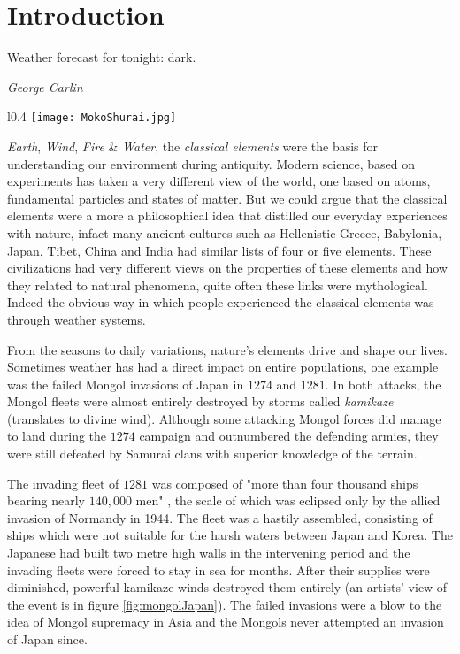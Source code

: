 \chapter{Introduction}\label{chapter:introduction}

\epigraph{Weather forecast for tonight: dark.}{\textit{George Carlin}}

\begin{wrapfigure}{l}{0.4\textwidth}
    \centering\texttt{[image: MokoShurai.jpg]}
    \caption{\small The Mongol fleet destroyed in a typhoon, ink and water on paper, by Kikuchi Y\={o}sai, 1847. 
    Source: Wikipedia}
    \label{fig:mongolJapan}
\end{wrapfigure}

\emph{Earth}, \emph{Wind}, \emph{Fire} \& \emph{Water}, the \emph{classical elements} were the basis 
for understanding our environment during antiquity. Modern science, based on experiments has taken a very 
different view of the world, one based on atoms, fundamental particles and states of matter. But we could 
argue that the classical elements were a more a philosophical idea that distilled our everyday experiences 
with nature, infact many ancient cultures such as Hellenistic Greece, Babylonia, Japan, Tibet, China and 
India had similar lists of four or five elements. These civilizations had very different views on the 
properties of these elements and how they related to natural phenomena, quite often these links 
were mythological. Indeed the obvious way in which people experienced the classical elements was through
weather systems. 

From the seasons to daily variations, nature's elements drive and shape our lives. Sometimes weather 
has had a direct impact on entire populations, one example was the failed Mongol invasions of Japan 
in $1274$ and $1281$. In both attacks, the Mongol fleets were almost entirely destroyed by storms called 
\emph{kamikaze} (translates to divine wind). Although some attacking Mongol forces did manage to land during 
the $1274$ campaign and outnumbered the defending armies, they were still defeated by Samurai clans with 
superior knowledge of the terrain. 

The invading fleet of $1281$ was composed of "more than four thousand ships bearing nearly $140,000$ men" 
\citep[pg.~17]{mcclain2002japan}, the scale of which was eclipsed only by the allied invasion of Normandy 
in 1944. The fleet was a hastily assembled, consisting of ships which were not suitable for the harsh waters 
between Japan and Korea. The Japanese had built two metre high walls in the intervening period and the invading 
fleets were forced to stay in sea for months. After their supplies were diminished, powerful kamikaze winds 
destroyed them entirely (an artists' view of the event is in figure \ref{fig:mongolJapan}). The failed invasions 
were a blow to the idea of Mongol supremacy in Asia and the Mongols never attempted an invasion of Japan since.

